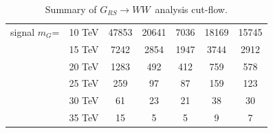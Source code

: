 \documentclass{cernrep}
\newcommand*{\rsg}{\ensuremath{G_{RS} \rightarrow WW}}
\begin{document}
\begin{table}[!htb]
{\begin{tabular}{|c|c|c|c|c|c|c|}
\hline
signal $m_{G}$= & 10 TeV        & 47853     & 20641   & 7036   & 18169  & 15745 \\
                & 15 TeV        & 7242      & 2854    & 1947   & 3744   & 2912  \\
                & 20 TeV        & 1283      & 492     & 412    & 759    & 578   \\
                & 25 TeV        & 259       & 97      & 87     & 159    & 123   \\
                & 30 TeV        & 61        & 23      & 21     & 38     & 30    \\
                & 35 TeV        & 15        & 5       & 5      & 9      & 7     \\
\hline
\hline
\end{tabular}}
\caption{Summary of \rsg\ analysis cut-flow.}
\label{tab:RSGww_cutflow}
\end{table}

\clearpage
\newpage

%
%
%
\end{document}
